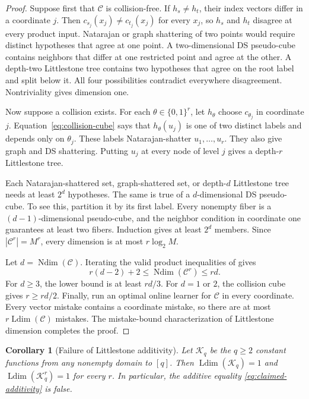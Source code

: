 \documentclass[twoside]{article}
\newtheorem{corollary}[theorem]{Corollary}
\newcommand{\C}{\mathcal C}
\newcommand{\Ldim}{\operatorname{Ldim}}
\newcommand{\Ndim}{\operatorname{Ndim}}
\begin{document}
\begin{proof}
Suppose first that $\C$ is collision-free. If $h_s\neq h_t$, their index vectors differ in a coordinate $j$. Then $c_{s_j}(x_j)\neq c_{t_j}(x_j)$ for every $x_j$, so $h_s$ and $h_t$ disagree at every product input. Natarajan or graph shattering of two points would require distinct hypotheses that agree at one point. A two-dimensional DS pseudo-cube contains neighbors that differ at one restricted point and agree at the other. A depth-two Littlestone tree contains two hypotheses that agree on the root label and split below it. All four possibilities contradict everywhere disagreement. Nontriviality gives dimension one.

Now suppose a collision exists. For each $\theta\in\{0,1\}^r$, let $h_\theta$ choose $c_{\theta_j}$ in coordinate $j$. Equation~\eqref{eq:collision-cube} says that $h_\theta(u_j)$ is one of two distinct labels and depends only on $\theta_j$. These labels Natarajan-shatter $u_1,\ldots,u_r$. They also give graph and DS shattering. Putting $u_j$ at every node of level $j$ gives a depth-$r$ Littlestone tree.

Each Natarajan-shattered set, graph-shattered set, or depth-$d$ Littlestone tree needs at least $2^d$ hypotheses. The same is true of a $d$-dimensional DS pseudo-cube. To see this, partition it by its first label. Every nonempty fiber is a $(d-1)$-dimensional pseudo-cube, and the neighbor condition in coordinate one guarantees at least two fibers. Induction gives at least $2^d$ members. Since $|\C^r|=M^r$, every dimension is at most $r\log_2M$.

Let $d=\Ndim(\C)$. Iterating the valid product inequalities of \citet{hanneke2024list} gives \[ r(d-2)+2\leq\Ndim(\C^r)\leq rd. \] For $d\geq3$, the lower bound is at least $rd/3$. For $d=1$ or $2$, the collision cube gives $r\geq rd/2$. Finally, run an optimal online learner for $\C$ in every coordinate. Every vector mistake contains a coordinate mistake, so there are at most $r\Ldim(\C)$ mistakes. The mistake-bound characterization of Littlestone dimension completes the proof.
\end{proof}

\begin{corollary}[Failure of Littlestone additivity]
\label{cor:littlestone}
Let $\mathcal K_q$ be the $q\geq2$ constant functions from any nonempty domain to $[q]$. Then $\Ldim(\mathcal K_q)=1$ and $\Ldim(\mathcal K_q^r)=1$ for every $r$. In particular, the additive equality \eqref{eq:claimed-additivity} is false.
\end{corollary}
\end{document}
